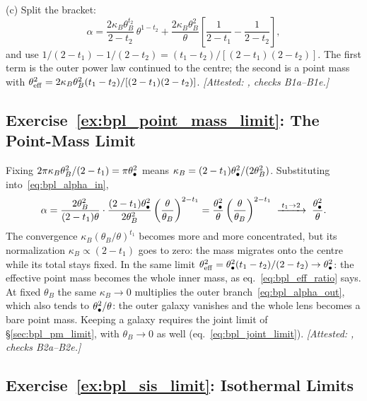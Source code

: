 (c) Split the bracket:
\begin{equation*}
    \alpha=\frac{2\kappa_B\theta_B^{t_2}}{2-t_2}\,\theta^{1-t_2}
      +\frac{2\kappa_B\theta_B^2}{\theta}\left[\frac{1}{2-t_1}-\frac{1}{2-t_2}\right] ,
\end{equation*}
and use $1/(2-t_1)-1/(2-t_2)=(t_1-t_2)/[(2-t_1)(2-t_2)]$.  The first
term is the outer power law continued to the centre; the second is a
point mass with
$\theta_{\rm eff}^2=2\kappa_B\theta_B^2(t_1-t_2)/[(2-t_1)(2-t_2)]$.
\emph{[Attested: , checks B1a--B1e.]}

\subsection*{Exercise~\ref{ex:bpl_point_mass_limit}: The Point-Mass Limit}

Fixing $2\pi\kappa_B\theta_B^2/(2-t_1)=\pi\theta_{\bullet}^2$ means
$\kappa_B=(2-t_1)\theta_{\bullet}^2/(2\theta_B^2)$.  Substituting
into~\eqref{eq:bpl_alpha_in},
\begin{equation*}
    \alpha=\frac{2\theta_B^2}{(2-t_1)\theta}\cdot\frac{(2-t_1)\theta_{\bullet}^2}{2\theta_B^2}
      \left(\frac{\theta}{\theta_B}\right)^{2-t_1}
    =\frac{\theta_{\bullet}^2}{\theta}\left(\frac{\theta}{\theta_B}\right)^{2-t_1}
    \;\xrightarrow{\;t_1\to2\;}\;\frac{\theta_{\bullet}^2}{\theta} .
\end{equation*}
The convergence $\kappa_B(\theta_B/\theta)^{t_1}$ becomes more and
more concentrated, but its normalization $\kappa_B\propto(2-t_1)$ goes
to zero: the mass migrates onto the centre while its total stays
fixed.  In the same limit
$\theta_{\rm eff}^2=\theta_{\bullet}^2(t_1-t_2)/(2-t_2)\to\theta_{\bullet}^2$: the
effective point mass becomes the whole inner mass, as
eq.~\eqref{eq:bpl_eff_ratio} says.  At fixed $\theta_B$ the same
$\kappa_B\to0$ multiplies the outer branch~\eqref{eq:bpl_alpha_out},
which also tends to $\theta_{\bullet}^2/\theta$: the outer galaxy vanishes and
the whole lens becomes a bare point mass.  Keeping a galaxy requires
the joint limit of \S\ref{sec:bpl_pm_limit}, with
$\theta_B\to0$ as well (eq.~\ref{eq:bpl_joint_limit}).
\emph{[Attested: , checks B2a--B2e.]}

\subsection*{Exercise~\ref{ex:bpl_sis_limit}: Isothermal Limits}

